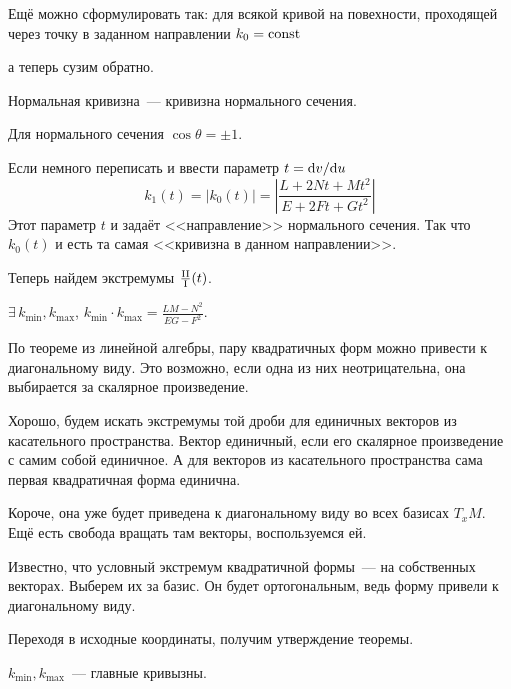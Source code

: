 \documentclass[draft,timbord]{longnotes}
\begin{document}
\begin{rem}\label{rem:meas::curfctr::menie::ref}
  Ещё можно сформулировать так: для всякой кривой на повехности, проходящей через точку 
  в заданном направлении $k_0 = \rm const$
\end{rem}

а теперь сузим обратно.
\begin{defn}\label{defn:meas::curfctr::normcrvf}
  Нормальная кривизна~--- кривизна нормального сечения.
\end{defn}

Для нормального сечения $\cos\theta = \pm 1$.

Если немного переписать и ввести параметр $t= \mathrm{d} v /\mathrm{d} u $
\[
  k_1(t) = |k_0(t)| = \left|\frac{L + 2Nt + Mt^2}{E + 2Ft +Gt^2} \right|
\]
Этот параметр $t$ и задаёт <<направление>> нормального сечения. 
Так что $k_0(t)$ и есть та самая <<кривизна в данном направлении>>.

Теперь найдем экстремумы $\frac{\rm II}{\rm I} (t)$. 
\begin{thrm}\label{thrm:meas::curfctr::minmax}
  $\exists\, k_{\min}, k_{\max}$, $k_{\min} \cdot k_{\max} = \frac{LM - N^2}{EG - F^2}$.
\end{thrm}
\begin{tproof}
  По теореме из линейной алгебры, пару квадратичных форм можно привести к диагональному виду.
  Это возможно, если одна из них неотрицательна, она выбирается за скалярное произведение.

  Хорошо, будем искать экстремумы той дроби для единичных векторов из касательного пространства. 
  Вектор единичный, если его скалярное произведение с самим собой единичное. А для 
  векторов из касательного пространства сама первая квадратичная форма единична.

  Короче, она уже будет приведена к диагональному виду во всех базисах $T_xM$. Ещё
  есть свобода вращать там векторы, воспользуемся ей. 

  Известно, что условный экстремум квадратичной формы~--- на собственных векторах. 
  Выберем их за базис. Он будет ортогональным, ведь форму привели к диагональному виду.

  Переходя в исходные координаты, получим утверждение теоремы.
\end{tproof}

\begin{defn}\label{defn:meas::curfctr::main}
  $k_{\min}, k_{\max}$~--- главные кривызны.
\end{defn}
\end{document}
